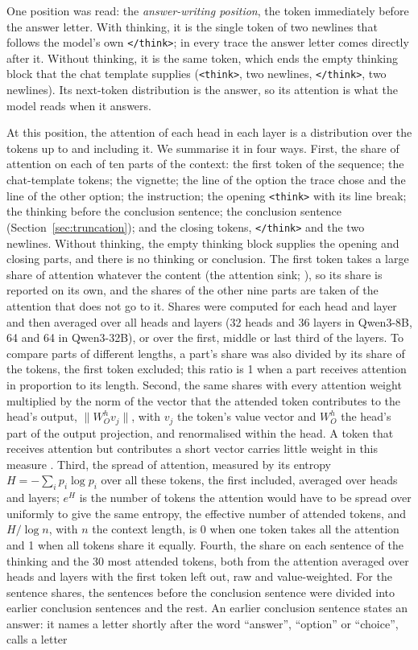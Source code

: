 \documentclass[11pt]{article}
\begin{document}
One position was read: the \emph{answer-writing position}, the token immediately before the answer letter. With thinking, it is the single token of two newlines that follows the model's own \texttt{</think>}; in every trace the answer letter comes directly after it. Without thinking, it is the same token, which ends the empty thinking block that the chat template supplies (\texttt{<think>}, two newlines, \texttt{</think>}, two newlines). Its next-token distribution is the answer, so its attention is what the model reads when it answers.

At this position, the attention of each head in each layer is a distribution over the tokens up to and including it. We summarise it in four ways. First, the share of attention on each of ten parts of the context: the first token of the sequence; the chat-template tokens; the vignette; the line of the option the trace chose and the line of the other option; the instruction; the opening \texttt{<think>} with its line break; the thinking before the conclusion sentence; the conclusion sentence (Section~\ref{sec:truncation}); and the closing tokens, \texttt{</think>} and the two newlines. Without thinking, the empty thinking block supplies the opening and closing parts, and there is no thinking or conclusion. The first token takes a large share of attention whatever the content (the attention sink; \citealp{xiao2024efficient,barbero2025why}), so its share is reported on its own, and the shares of the other nine parts are taken of the attention that does not go to it. Shares were computed for each head and layer and then averaged over all heads and layers (32 heads and 36 layers in Qwen3-8B, 64 and 64 in Qwen3-32B), or over the first, middle or last third of the layers. To compare parts of different lengths, a part's share was also divided by its share of the tokens, the first token excluded; this ratio is 1 when a part receives attention in proportion to its length. Second, the same shares with every attention weight multiplied by the norm of the vector that the attended token contributes to the head's output, $\lVert W_O^h v_j \rVert$, with $v_j$ the token's value vector and $W_O^h$ the head's part of the output projection, and renormalised within the head. A token that receives attention but contributes a short vector carries little weight in this measure \citep{kobayashi2020attention}. Third, the spread of attention, measured by its entropy $H = -\sum_i p_i \log p_i$ over all these tokens, the first included, averaged over heads and layers; $e^{H}$ is the number of tokens the attention would have to be spread over uniformly to give the same entropy, the effective number of attended tokens, and $H / \log n$, with $n$ the context length, is 0 when one token takes all the attention and 1 when all tokens share it equally. Fourth, the share on each sentence of the thinking and the 30 most attended tokens, both from the attention averaged over heads and layers with the first token left out, raw and value-weighted. For the sentence shares, the sentences before the conclusion sentence were divided into earlier conclusion sentences and the rest. An earlier conclusion sentence states an answer: it names a letter shortly after the word ``answer'', ``option'' or ``choice'', calls a letter 
\end{document}
